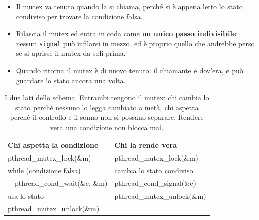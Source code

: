 \begin{itemize}
    \item Il mutex va tenuto quando la si chiama, perché si è appena letto lo stato condiviso per trovare la condizione falsa.
    \item Rilascia il mutex ed entra in coda come \textbf{un unico passo indivisibile}: nessun \texttt{signal} può infilarsi
          in mezzo, ed è proprio quello che andrebbe perso se si aprisse il mutex da soli prima.
    \item Quando ritorna il mutex è di nuovo tenuto: il chiamante è dov'era, e può guardare lo stato ancora una volta.
\end{itemize}

\begin{table}[H]
\centering
\begin{tabular}{>{\ttfamily}l >{\ttfamily}l}
\toprule
\normalfont\textbf{Chi aspetta la condizione} & \normalfont\textbf{Chi la rende vera} \\
\midrule
pthread\_mutex\_lock(\&m)             & pthread\_mutex\_lock(\&m) \\
while (condizione falsa)              & \normalfont cambia lo stato condiviso \\
\ \ pthread\_cond\_wait(\&c, \&m)     & pthread\_cond\_signal(\&c) \\
\normalfont usa lo stato              & pthread\_mutex\_unlock(\&m) \\
pthread\_mutex\_unlock(\&m)           & \\
\bottomrule
\end{tabular}
\caption{I due lati dello schema. Entrambi tengono il mutex: chi cambia lo stato perché nessuno lo legga cambiato a metà,
         chi aspetta perché il controllo e il sonno non si possano separare. Rendere vera una condizione non blocca mai.}
\end{table}


